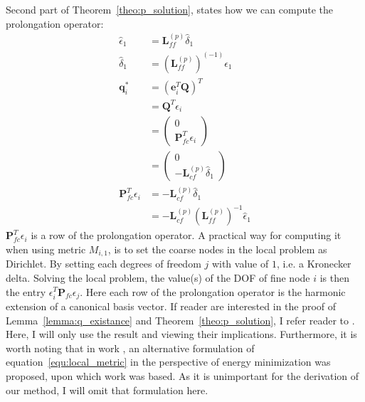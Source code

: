 Second part of Theorem~\ref{theo:p_solution}, states how we can compute the prolongation operator:
\begin{align}
\hat{\epsilon}_1 &= \mathbf{L}^{(p)}_{ff}\hat{\delta}_1 \nonumber \\
\hat{\delta}_1 &= (\mathbf{L}^{(p)}_{ff})^{(-1)}\hat{\epsilon}_1 \nonumber \\
\mathbf{q}_i^* &= (\mathbf{e}^T_i\mathbf{Q})^T \nonumber \\
&= \mathbf{Q}^T\epsilon_i \nonumber \\
&= \left(\begin{array}{c} 0 \\ \mathbf{P}^T_{fc}\epsilon_i\end{array}\right) \nonumber \\
&= \left(\begin{array}{c}0 \\ -\mathbf{L}^{(p)}_{cf}\hat{\delta}_1\end{array}\right) \nonumber \\
\mathbf{P}^T_{fc}\epsilon_i &=  -\mathbf{L}^{(p)}_{cf}\hat{\delta}_1 \nonumber \\
&= -\mathbf{L}^{(p)}_{cf}(\mathbf{L}^{(p)}_{ff})^{-1}\hat{\epsilon}_1 \label{equ:p_solution}
\end{align}
$\mathbf{P}^T_{fc}\epsilon_i$ is a row of the prolongation operator. A practical way for computing it when using metric $M_{i,1}$, is to set the coarse nodes in the local problem as Dirichlet. By setting each degrees of freedom $j$ with value of $1$, i.e. a Kronecker delta. Solving the local problem, the value(s) of the DOF of fine node $i$ is then the entry $\epsilon^T_i\mathbf{P}_{fc}\epsilon_j$.
Here each row of the prolongation operator is the harmonic extension of a canonical basis vector.
If reader are interested in the proof of Lemma~\ref{lemma:q_existance} and Theorem~\ref{theo:p_solution}, I refer reader to \cite{brezina2001algebraic}. Here, I will only use the result and viewing their implications. Furthermore, it is worth noting that in work \cite{henson2001element}, an alternative formulation of equation~\ref{equ:local_metric} in the perspective of energy minimization was proposed, upon which work \cite{dohrmann2007interpolation} was based. As it is unimportant for the derivation of our method, I will omit that formulation here.